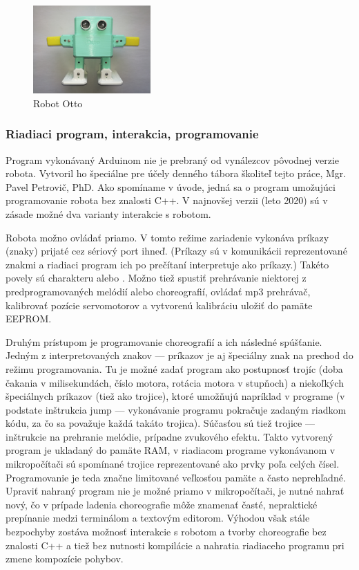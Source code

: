 \begin{figure}
\centerline{\includegraphics[width=0.4\textwidth]{images/otto}}
\caption[Robot Otto]{Robot Otto}
\label{obr:otto}
\end{figure}

\subsubsection{Riadiaci program, interakcia, programovanie}
Program vykonávaný Arduinom nie je prebraný od vynálezcov pôvodnej verzie robota. Vytvoril ho špeciálne pre účely denného tábora školiteľ tejto práce, Mgr. Pavel Petrovič, PhD. Ako spomíname v úvode, jedná sa o program umožujúci programovanie robota bez znalosti C++. V najnovšej verzii (leto 2020) sú v zásade možné dva varianty interakcie s robotom.

Robota možno ovládať priamo. V tomto režime zariadenie vykonáva príkazy (znaky) prijaté cez sériový port ihneď. (Príkazy sú v komunikácii reprezentované znakmi a riadiaci program ich po prečítaní interpretuje ako príkazy.) Takéto povely sú charakteru  alebo . Možno tiež spustiť prehrávanie niektorej z predprogramovaných melódií alebo choreografií, ovládať mp3 prehrávač, kalibrovať pozície servomotorov a vytvorenú kalibráciu uložiť do pamäte EEPROM.

Druhým prístupom je programovanie choreografií a ich následné spúšťanie. Jedným z interpretovaných znakov --- príkazov je aj špeciálny znak na prechod do režimu programovania. Tu je možné zadať program ako postupnosť trojíc (doba čakania v milisekundách, číslo motora, rotácia motora v stupňoch) a niekoľkých špeciálnych príkazov (tiež ako trojice), ktoré umožňujú napríklad  v programe (v podstate inštrukcia jump --- vykonávanie programu pokračuje zadaným riadkom kódu, za čo sa považuje každá takáto trojica). Súčasťou sú tiež trojice --- inštrukcie na prehranie melódie, prípadne zvukového efektu. Takto vytvorený program je ukladaný do pamäte RAM, v riadiacom programe vykonávanom v mikropočítači sú spomínané trojice reprezentované ako prvky poľa celých čísel. Programovanie je teda značne limitované veľkosťou pamäte a často neprehľadné. Upraviť nahraný program nie je možné priamo v mikropočítači, je nutné nahrať nový, čo v prípade ladenia choreografie môže znamenať časté, nepraktické prepínanie medzi terminálom a textovým editorom. Výhodou však stále bezpochyby zostáva možnosť interakcie s robotom a tvorby choreografie bez znalosti C++ a tiež bez nutnosti kompilácie a nahratia riadiaceho programu pri zmene kompozície pohybov.


